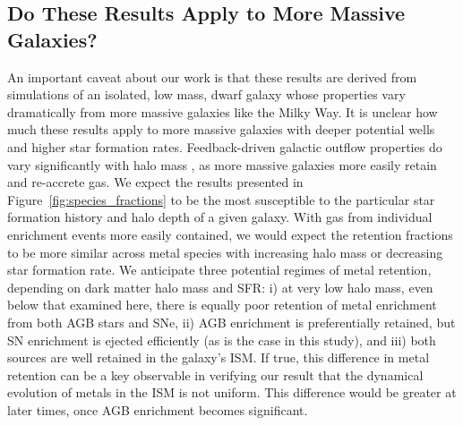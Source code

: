 \subsection{Do These Results Apply to More Massive Galaxies?}
\label{sec:massive galaxies}
An important caveat about our work is that these results are derived from simulations of an isolated, low mass, dwarf galaxy whose properties vary dramatically from more massive galaxies like the Milky Way. It is unclear how much these results apply to more massive galaxies with deeper potential wells and higher star formation rates. Feedback-driven galactic outflow properties do vary significantly with halo mass \citep[e.g.][]{MacLowFerrara1999,Muratov2017}, as more massive galaxies more easily retain and re-accrete gas. We expect the results presented in Figure~\ref{fig:species_fractions} to be the most susceptible to the particular star formation history and halo depth of a given galaxy. With gas from individual enrichment events more easily contained, we would expect the retention fractions to be more similar across metal species with increasing halo mass or decreasing star formation rate. We anticipate three potential regimes of metal retention, depending on dark matter halo mass and SFR: i) at very low halo mass, even below that examined here, there is equally poor retention of metal enrichment from both AGB stars and SNe, ii) AGB enrichment is preferentially retained, but SN enrichment is ejected efficiently (as is the case in this study), and iii) both sources are well retained in the galaxy's ISM. If true, this difference in metal retention can be a key observable in verifying our result that the dynamical evolution of metals in the ISM is not uniform.
This difference would be greater at later times, once AGB enrichment becomes significant. 
